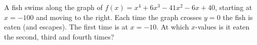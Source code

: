 A fish swims along the graph of $f(x)=x^4+6x^3-41x^2-6x+40$, starting at $x=-100$ and moving to the right. Each time the graph crosses $y=0$ the fish is eaten (and escapes). The first time is at $x=-10$. At which $x$-values is it eaten the second, third and fourth times?
